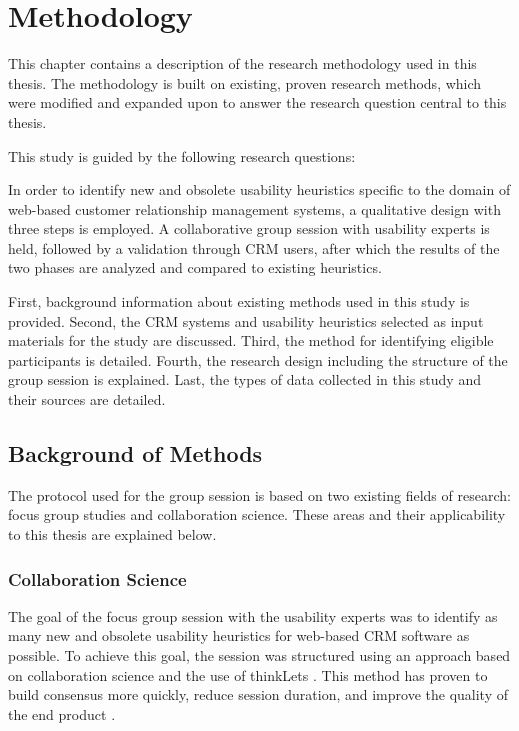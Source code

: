 \chapter{Methodology}
\label{chap:method}
This chapter contains a description of the research methodology used in this thesis. The methodology is built on existing, proven research methods, which were modified and expanded upon to answer the research question central to this thesis.

This study is guided by the following research questions:

\RQ{}

In order to identify new and obsolete usability heuristics specific to the domain of web-based customer relationship management systems, a qualitative design with three steps is employed. A collaborative group session with usability experts is held, followed by a validation through CRM users, after which the results of the two phases are analyzed and compared to existing heuristics.

First, background information about existing methods used in this study is provided. Second, the CRM systems and usability heuristics selected as input materials for the study are discussed. Third, the method for identifying eligible participants is detailed. Fourth, the research design including the structure of the group session is explained. Last, the types of data collected in this study and their sources are detailed.

\section{Background of Methods}
The protocol used for the group session is based on two existing fields of research: focus group studies and collaboration science. These areas and their applicability to this thesis are explained below.

\subsection{Collaboration Science}
The goal of the focus group session with the usability experts was to identify as many new and obsolete usability heuristics for web-based CRM software as possible. To achieve this goal, the session was structured using an approach based on collaboration science and the use of thinkLets \citep{Briggs2001}. This method has proven to build consensus more quickly, reduce session duration, and improve the quality of the end product \citep{Vreede2005}.

